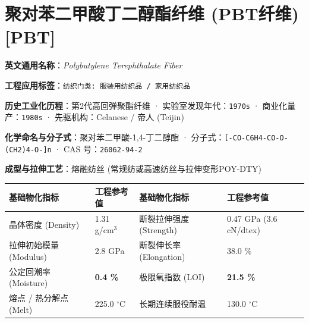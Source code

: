 \documentclass[11pt,openright,twoside,UTF8]{ctexbook}
\begin{document}
\section{聚对苯二甲酸丁二醇酯纤维 (PBT纤维) [PBT]}
\label{sec:pbt}

\noindent\textbf{英文通用名称}：\textit{Polybutylene Terephthalate Fiber}\par
\noindent\textbf{工程应用标签}：\texttt{纺织门类: 服装用纺织品 / 家用纺织品}\par
\noindent\textbf{历史工业化历程}：第2代高回弹聚酯纤维 · 实验室发现年代：\texttt{1970s} · 商业化量产：\texttt{1980s} · 先驱机构：Celanese / 帝人 (Teijin)\par
\noindent\textbf{化学命名与分子式}：聚对苯二甲酸-1,4-丁二醇酯 · 分子式：\texttt{[-CO-C6H4-CO-O-(CH2)4-O-]n} · CAS 号：\texttt{26062-94-2}\par
\noindent\textbf{成型与拉伸工艺}：熔融纺丝 (常规纺或高速纺丝与拉伸变形POY-DTY)\par

\vspace{0.15cm}
\begin{center}
\small
\begin{tabularx}{\textwidth}{p{3.8cm}Xp{3.8cm}X}
\toprule
\textbf{基础物化指标} & \textbf{工程参考值} & \textbf{基础物化指标} & \textbf{工程参考值} \\
\midrule
晶体密度 (Density) & 1.31 g/cm$^3$ & 断裂拉伸强度 (Strength) & 0.47 GPa (3.6 cN/dtex) \\
拉伸初始模量 (Modulus) & 2.8 GPa & 断裂伸长率 (Elongation) & 38.0 \% \\
公定回潮率 (Moisture) & \textbf{0.4 \%} & 极限氧指数 (LOI) & \textbf{21.5 \%} \\
熔点 / 热分解点 (Melt) & 225.0 $^\circ\mathrm{C}$ & 长期连续服役耐温 & 130.0 $^\circ\mathrm{C}$ \\
\bottomrule
\end{tabularx}
\end{center}
\vspace{0.15cm}
\end{document}
